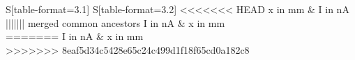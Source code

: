 \begin{table}
    \centering
    \caption{Intensität der TEM$_{00}$-Mode entlang der x-Achse}
    \label{tab:TEM_00}
    \begin{tabular}{
	S[table-format=3.1]
	S[table-format=3.2]
	}
	\toprule
<<<<<<< HEAD
	{x in \si{\milli\meter}}		& {I in \si{\nano\ampere}}		\\ 
||||||| merged common ancestors
	{I in \si{\nano\ampere}	}	& {x in \si{\milli\meter}}		\\ 
=======
	{I in \si{\nano\ampere}}		& {x in \si{\milli\meter}}		\\ 
>>>>>>> 8eaf5d34c5428e65c24c499d1f18f65cd0a182c8
	\midrule
    
    \bottomrule
    \end{tabular}
    \end{table}
